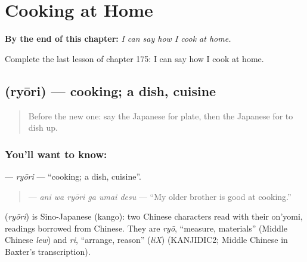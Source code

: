 
\chapter{Cooking at Home}
\label{ch:ja-cooking-at-home}

\begin{chapteropening}
\textbf{By the end of this chapter:} \emph{I can say how I cook at home.}

Complete the last lesson of chapter 175: I can say how I cook at home.
\end{chapteropening}

\section[\texorpdfstring{\ja{りょうり} (ryōri)}{りょうり (ryōri)}]{ (ryōri) — cooking; a dish, cuisine}

\label{lesson:JA-C175-ryouri}



\begin{quote}
Before the new one: say the Japanese for plate, then the Japanese for to dish up.
\end{quote}

\subsection*{You'll want to know: }
\textbf{} — \emph{ryōri} — \textquotedblleft{}cooking; a dish, cuisine\textquotedblright{}.

\begin{quote}
\textbf{  } — \emph{ani wa ryōri ga umai desu} — \textquotedblleft{}My older brother is good at cooking.\textquotedblright{}
\end{quote}

\begin{cousinweb}
\textbf{} (\emph{ryōri}) is Sino-Japanese (kango): two Chinese characters read with their on'yomi, readings borrowed from Chinese. They are \emph{ryō}, \textquotedblleft{}measure, materials\textquotedblright{} (Middle Chinese \emph{lew}) and \emph{ri}, \textquotedblleft{}arrange, reason\textquotedblright{} (\emph{liX}) (KANJIDIC2; Middle Chinese in Baxter's transcription).
\end{cousinweb}

